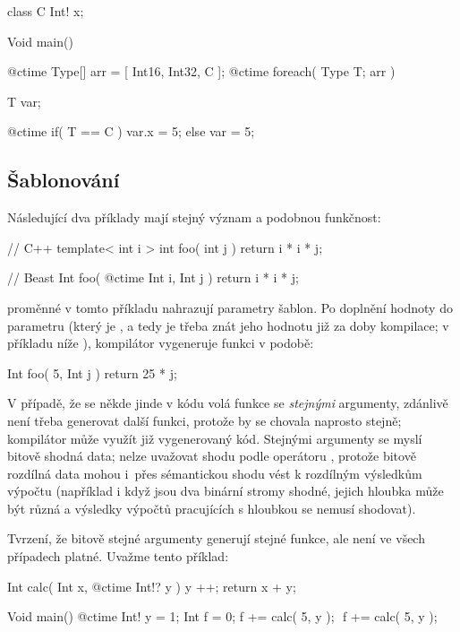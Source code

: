 \begin{code}
class C { 
	Int! x;
}
	
Void main() {
	@ctime Type[] arr = [ Int16, Int32, C ];
	@ctime foreach( Type T; arr ) {
		T var;
		
		@ctime if( T == C )
			var.x = 5;
		else
			var = 5;
	}
}
\end{code}

\subsection{Šablonování}
Následující dva příklady mají stejný význam a podobnou funkčnost:

\begin{cppcode}
// C++
template< int i >
int foo( int j ) {
	return i * i * j;
}
\end{cppcode}

\begin{code}
// Beast
Int foo( @ctime Int i, Int j ) {
	return i * i * j;
}
\end{code}

\ctime proměnné v tomto příkladu nahrazují parametry šablon. Po doplnění hodnoty do parametru  (který je \ctime, a tedy je třeba znát jeho hodnotu již za doby kompilace; v příkladu níže ), kompilátor vygeneruje funkci v podobě:

\begin{code}
Int foo( 5, Int j ) {
	return 25 * j;
}
\end{code}

V případě, že se někde jinde v kódu volá funkce  se \textit{stejnými} \ctime argumenty, zdánlivě není třeba generovat další funkci, protože by se chovala naprosto stejně; kompilátor může využít již vygenerovaný kód. Stejnými \ctime argumenty se myslí bitově shodná data; nelze uvažovat shodu podle operátoru \inlineCode{==}, protože bitově rozdílná data mohou i~přes sémantickou shodu vést k rozdílným výsledkům výpočtu (například i když jsou dva binární stromy shodné, jejich hloubka může být různá a výsledky výpočtů pracujících s hloubkou se nemusí shodovat).

Tvrzení, že bitově stejné \ctime argumenty generují stejné funkce, ale není ve všech případech platné. Uvažme tento příklad: \nopagebreak

\begin{code}
Int calc( Int x, @ctime Int!? y ) {
	y ++;
	return x + y;
}

Void main() {
	@ctime Int! y = 1;
	Int f = 0;
	f += calc( 5, y ); $\label{ctime:impl:templ:1}$
	f += calc( 5, y ); $\label{ctime:impl:templ:2}$
}
\end{code}

